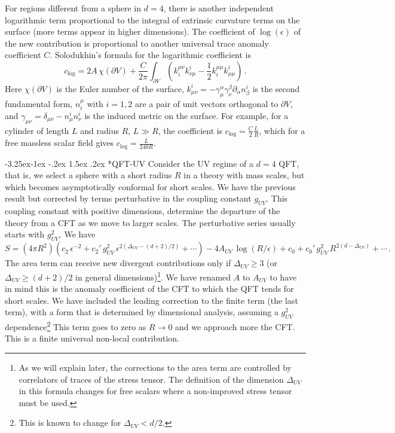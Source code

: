 \documentclass[11pt,a4paper]{article}
\makeatletter
\renewcommand\subsubsection{\@startsection{subsubsection}{3}{\z@}%
                                   {-3.25ex\@plus -1ex \@minus -.2ex}%
                                     {1.5ex \@plus .2ex}%
                                     {\normalfont\itshape}}
\numberwithin{equation}{section}
\newcommand{\be}{\begin{equation}}
\newcommand{\ee}{\end{equation}}
\makeatother
\begin{document}
 For regions different from a sphere in $d=4$, there is another independent logarithmic term  proportional to the integral of extrinsic curvature terms on the surface (more terms appear in higher dimensions). The coefficient of $\log(\epsilon)$ of the new contribution is proportional to another universal trace anomaly coefficient $C$. Solodukhin's formula for the logarithmic coefficient is
\begin{equation}
c_{\textrm{log}}=2A \,\chi(\partial V)+\frac{C}{2 \pi}   \int_{\partial V}(k_i^{\mu \nu}k^i_{\nu \mu} -\frac{1}{2} k_i^{\mu \mu}k^i_{\mu \mu})\,.\label{general}
\end{equation}
Here $\chi(\partial V)$ is the Euler number of the surface,  $k^i_{\mu\nu}=-\gamma^\alpha_\mu \gamma^\beta_\nu \partial_\alpha n^i_\beta$ is 
the second fundamental form, $n^\mu_i$ with $i=1,2$ are a pair of unit vectors orthogonal to $\partial V$, and $\gamma_{\mu\nu}=\delta_{\mu\nu}-n^i_\mu n^i_\nu$ is 
the induced metric on the surface. 
For example, for a cylinder of length $L$ and radius $R$, $L\gg R$, the coefficient is $c_{\textrm{log}}=\frac{C}{2}\frac{L}{R}$, which for a free massless scalar field gives $c_{\textrm{log}}=\frac{L}{240 R}$.



\subsubsection*{QFT-UV}
Consider the UV regime of a $d=4$ QFT, that is, we select a sphere with a short radius $R$ in a theory with mass scales, but which becomes asymptotically conformal for short scales.  We have the previous result but corrected by terms perturbative in the coupling constant $g_{UV}$. This coupling constant with positive dimensions, determine the departure of the theory from a CFT as we move to larger scales. The perturbative series usually starts with $g_{UV}^2$. We have 
\be
S=(4 \pi R^2)\left(c_2 \,\epsilon^{-2}+ c_{2}'\,g_{UV}^2 \,\epsilon^{2 \left(\Delta_{UV} -(d+2)/2\right)} +\cdots\right)- 4 A_{UV} \, \log(R/\epsilon) +c_0 +c_0'\, g_{UV}^2 \, R^{2(d-\Delta_{UV})}+\cdots\,.\label{uvi}
\ee
The area term can receive new divergent contributions only if $\Delta_{UV}\ge 3$ (or $\Delta_{UV}\ge (d+2)/2$ in general dimensions)\footnote{As we will explain later, the corrections to the area term are controlled by correlators of traces of the stress tensor. The definition of the dimension $\Delta_{UV}$ in this formula changes for free scalars where a non-improved stress tensor must be used.}. We have renamed $A$ to $A_{UV}$ to have in mind this is the anomaly coefficient of the CFT to which the QFT tends for short scales. We have included the leading correction to the finite term (the last term), with a form that is determined by dimensional analysis,  assuming a $g_{UV}^2$ dependence\footnote{This is known to change for $\Delta_{UV}<d/2$.} This term goes to zero as $R\rightarrow 0$ and we approach more the CFT. This is a finite universal non-local contribution.  
\end{document}
